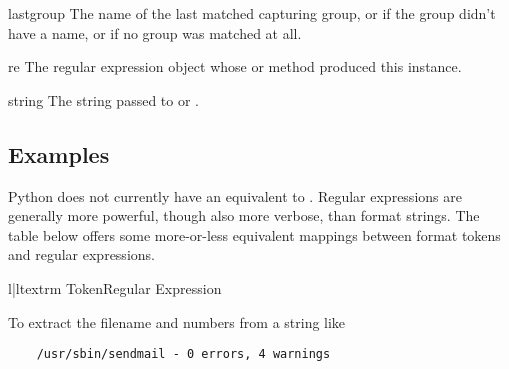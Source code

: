 \begin{memberdesc}[MatchObject]{lastgroup}
The name of the last matched capturing group, or  if the
group didn't have a name, or if no group was matched at all.
\end{memberdesc}

\begin{memberdesc}[MatchObject]{re}
The regular expression object whose  or
 method produced this  instance.
\end{memberdesc}

\begin{memberdesc}[MatchObject]{string}
The string passed to  or .
\end{memberdesc}

\subsection{Examples}


Python does not currently have an equivalent to .
Regular expressions are generally more powerful, though also more
verbose, than  format strings.  The table below
offers some more-or-less equivalent mappings between
 format tokens and regular expressions.

\begin{tableii}{l|l}{textrm}{ Token}{Regular Expression}
         {}
         {}
         {}
         {}
         {}
         {}
         {}
         {}
         {}
\end{tableii}

To extract the filename and numbers from a string like

\begin{verbatim}
    /usr/sbin/sendmail - 0 errors, 4 warnings
\end{verbatim}

